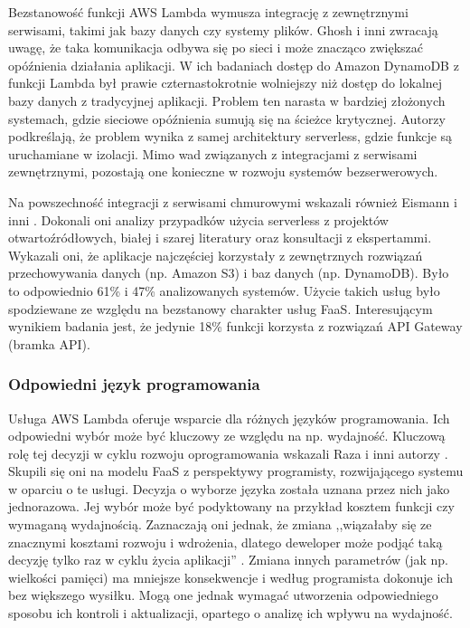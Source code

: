 Bezstanowość funkcji AWS Lambda wymusza integrację z zewnętrznymi serwisami, takimi jak bazy danych czy systemy plików.
Ghosh i inni \cite{9027427} zwracają uwagę, że taka komunikacja odbywa się po sieci i może znacząco zwiększać opóźnienia działania aplikacji.
W ich badaniach dostęp do Amazon DynamoDB z funkcji Lambda był prawie czternastokrotnie wolniejszy niż dostęp do lokalnej bazy danych z tradycyjnej aplikacji.
Problem ten narasta w bardziej złożonych systemach, gdzie sieciowe opóźnienia sumują się na ścieżce krytycznej.
Autorzy podkreślają, że problem wynika z samej architektury serverless, gdzie funkcje są uruchamiane w izolacji.
Mimo wad związanych z integracjami z serwisami zewnętrznymi, pozostają one konieczne w rozwoju systemów bezserwerowych.

Na powszechność integracji z serwisami chmurowymi wskazali również Eismann i inni \cite{eismann2021reviewserverlessusecases}.
Dokonali oni analizy przypadków użycia serverless z projektów otwartoźródłowych, białej i szarej literatury oraz konsultacji z ekspertammi.
Wykazali oni, że aplikacje najczęściej korzystały z zewnętrznych rozwiązań przechowywania danych (np. Amazon S3) i baz danych (np. DynamoDB).
Było to odpowiednio 61\% i 47\% analizowanych systemów.
Użycie takich usług było spodziewane ze względu na bezstanowy charakter usług FaaS.
Interesującym wynikiem badania jest, że jedynie 18\% funkcji korzysta z rozwiązań API Gateway (bramka API).

\subsubsection*{Odpowiedni język programowania}

Usługa AWS Lambda oferuje wsparcie dla różnych języków programowania. 
Ich odpowiedni wybór może być kluczowy ze względu na np. wydajność.
Kluczową rolę tej decyzji w cyklu rozwoju oprogramowania wskazali Raza i inni autorzy \cite{raza2021sok}.
Skupili się oni na modelu FaaS z perspektywy programisty, rozwijającego systemu w oparciu o te usługi.
Decyzja o wyborze języka została uznana przez nich jako jednorazowa.
Jej wybór może być podyktowany na przykład kosztem funkcji czy wymaganą wydajnością.
Zaznaczają oni jednak, że zmiana ,,wiązałaby się ze znacznymi kosztami rozwoju i wdrożenia, dlatego deweloper może podjąć taką decyzję tylko raz w cyklu życia aplikacji'' \cite{raza2021sok}.
Zmiana innych parametrów (jak np. wielkości pamięci) ma mniejsze konsekwencje i według programista dokonuje ich bez większego wysiłku.
Mogą one jednak wymagać utworzenia odpowiedniego sposobu ich kontroli i aktualizacji, opartego o analizę ich wpływu na wydajność.

